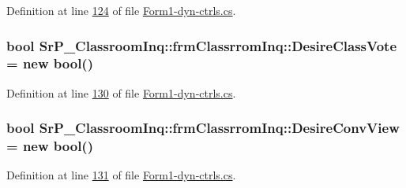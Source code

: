 \-Definition at line \hyperlink{_form1-dyn-ctrls_8cs_source_l00124}{124} of file \hyperlink{_form1-dyn-ctrls_8cs_source}{\-Form1-\/dyn-\/ctrls.\-cs}.

\hypertarget{class_sr_p___classroom_inq_1_1frm_classrrom_inq_af51d439b56b35a3b7d8fdaa6bb5252cd}{
\subsubsection[{\-Desire\-Class\-Vote}]{\setlength{\rightskip}{0pt plus 5cm}bool {\bf \-Sr\-P\-\_\-\-Classroom\-Inq\-::frm\-Classrrom\-Inq\-::\-Desire\-Class\-Vote} = new bool()}}
\label{class_sr_p___classroom_inq_1_1frm_classrrom_inq_af51d439b56b35a3b7d8fdaa6bb5252cd}


\-Definition at line \hyperlink{_form1-dyn-ctrls_8cs_source_l00130}{130} of file \hyperlink{_form1-dyn-ctrls_8cs_source}{\-Form1-\/dyn-\/ctrls.\-cs}.

\hypertarget{class_sr_p___classroom_inq_1_1frm_classrrom_inq_a3bd81e817c525b0cf0f1a0ae53e527d3}{
\subsubsection[{\-Desire\-Conv\-View}]{\setlength{\rightskip}{0pt plus 5cm}bool {\bf \-Sr\-P\-\_\-\-Classroom\-Inq\-::frm\-Classrrom\-Inq\-::\-Desire\-Conv\-View} = new bool()}}
\label{class_sr_p___classroom_inq_1_1frm_classrrom_inq_a3bd81e817c525b0cf0f1a0ae53e527d3}


\-Definition at line \hyperlink{_form1-dyn-ctrls_8cs_source_l00131}{131} of file \hyperlink{_form1-dyn-ctrls_8cs_source}{\-Form1-\/dyn-\/ctrls.\-cs}.

